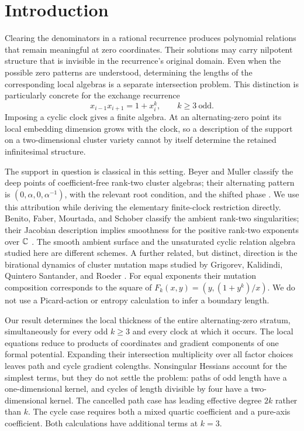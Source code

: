 \section{Introduction}\label{sec:intro}

Clearing the denominators in a rational recurrence produces polynomial
relations that remain meaningful at zero coordinates. Their solutions may
carry nilpotent structure that is invisible in the recurrence's original
domain. Even when the possible zero patterns are understood, determining
the lengths of the corresponding local algebras is a separate intersection
problem. This distinction is particularly concrete for the exchange
recurrence
\begin{equation}\label{eq:recurrence}
 x_{i-1}x_{i+1}=1+x_i^k,\qquad k\geq3\ \text{odd}.
\end{equation}
Imposing a cyclic clock gives a finite algebra. At an alternating-zero
point its local embedding dimension grows with the clock, so a description
of the support on a two-dimensional cluster variety cannot by itself
determine the retained infinitesimal structure.

The support in question is classical in this setting. Beyer and Muller
classify the deep points of coefficient-free rank-two cluster algebras;
their alternating pattern is $(0,\alpha,0,\alpha^{-1})$, with the relevant
root condition, and the shifted phase
\cite[Section~4, especially Corollary~4.6 in arXiv v1]{BM}.
We use this attribution while deriving the elementary finite-clock
restriction directly. Benito, Faber, Mourtada, and Schober classify the
ambient rank-two singularities; their Jacobian description implies
smoothness for the positive rank-two exponents over $\mathbb C$
\cite[Section~5, Theorem~5.2.3 in arXiv v2]{BFMS}.
The smooth ambient surface and the unsaturated cyclic relation algebra
studied here are different schemes. A further related, but distinct,
direction is the birational dynamics of cluster mutation maps studied by
Grigorev, Kalidindi, Quintero Santander, and Roeder \cite{GKQR}.
For equal exponents their mutation composition corresponds to the square
of $F_k(x,y)=(y,(1+y^k)/x)$. We do not use a Picard-action or entropy
calculation to infer a boundary length.

Our result determines the local thickness of the entire alternating-zero
stratum, simultaneously for every odd $k\geq3$ and every clock at which it
occurs. The local equations reduce to products of coordinates and gradient
components of one formal potential. Expanding their intersection
multiplicity over all factor choices leaves path and cycle gradient
colengths. Nonsingular Hessians account for the simplest terms, but they
do not settle the problem: paths of odd length have a one-dimensional
kernel, and cycles of length divisible by four have a two-dimensional
kernel. The cancelled path case has leading effective degree $2k$ rather
than $k$. The cycle case requires both a mixed quartic coefficient and a
pure-axis coefficient. Both calculations have additional terms at $k=3$.

